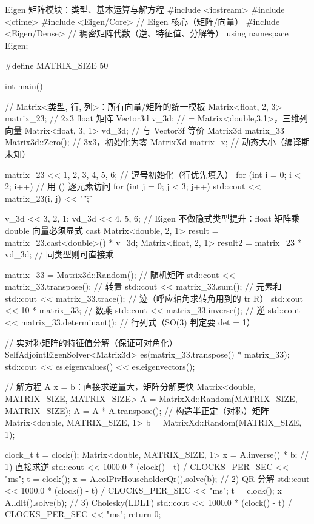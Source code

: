 \begin{codebox}[C++]{Eigen 矩阵模块：类型、基本运算与解方程}
#include <iostream>
#include <ctime>
#include <Eigen/Core>     // Eigen 核心（矩阵/向量）
#include <Eigen/Dense>    // 稠密矩阵代数（逆、特征值、分解等）
using namespace Eigen;

#define MATRIX_SIZE 50

int main() {
    // Matrix<类型, 行, 列>：所有向量/矩阵的统一模板
    Matrix<float, 2, 3> matrix_23;          // 2x3 float 矩阵
    Vector3d v_3d;                          // = Matrix<double,3,1>，三维列向量
    Matrix<float, 3, 1> vd_3d;              // 与 Vector3f 等价
    Matrix3d matrix_33 = Matrix3d::Zero();  // 3x3，初始化为零
    MatrixXd matrix_x;                      // 动态大小（编译期未知）

    matrix_23 << 1, 2, 3, 4, 5, 6;          // 逗号初始化（行优先填入）
    for (int i = 0; i < 2; i++)             // 用 () 逐元素访问
        for (int j = 0; j < 3; j++) std::cout << matrix_23(i, j) << "\t";

    v_3d << 3, 2, 1;
    vd_3d << 4, 5, 6;
    // Eigen 不做隐式类型提升：float 矩阵乘 double 向量必须显式 cast
    Matrix<double, 2, 1> result = matrix_23.cast<double>() * v_3d;
    Matrix<float, 2, 1> result2 = matrix_23 * vd_3d;   // 同类型则可直接乘

    matrix_33 = Matrix3d::Random();         // 随机矩阵
    std::cout << matrix_33.transpose();     // 转置
    std::cout << matrix_33.sum();           // 元素和
    std::cout << matrix_33.trace();         // 迹（呼应轴角求转角用到的 tr R）
    std::cout << 10 * matrix_33;            // 数乘
    std::cout << matrix_33.inverse();       // 逆
    std::cout << matrix_33.determinant();   // 行列式（SO(3) 判定要 det = 1）

    // 实对称矩阵的特征值分解（保证可对角化）
    SelfAdjointEigenSolver<Matrix3d> es(matrix_33.transpose() * matrix_33);
    std::cout << es.eigenvalues() << es.eigenvectors();

    // 解方程 A x = b：直接求逆量大，矩阵分解更快
    Matrix<double, MATRIX_SIZE, MATRIX_SIZE> A
        = MatrixXd::Random(MATRIX_SIZE, MATRIX_SIZE);
    A = A * A.transpose();                   // 构造半正定（对称）矩阵
    Matrix<double, MATRIX_SIZE, 1> b = MatrixXd::Random(MATRIX_SIZE, 1);

    clock_t t = clock();
    Matrix<double, MATRIX_SIZE, 1> x = A.inverse() * b;          // 1) 直接求逆
    std::cout << 1000.0 * (clock() - t) / CLOCKS_PER_SEC << "ms";
    t = clock();
    x = A.colPivHouseholderQr().solve(b);                        // 2) QR 分解
    std::cout << 1000.0 * (clock() - t) / CLOCKS_PER_SEC << "ms";
    t = clock();
    x = A.ldlt().solve(b);                                       // 3) Cholesky(LDLT)
    std::cout << 1000.0 * (clock() - t) / CLOCKS_PER_SEC << "ms";
    return 0;
}
\end{codebox}
